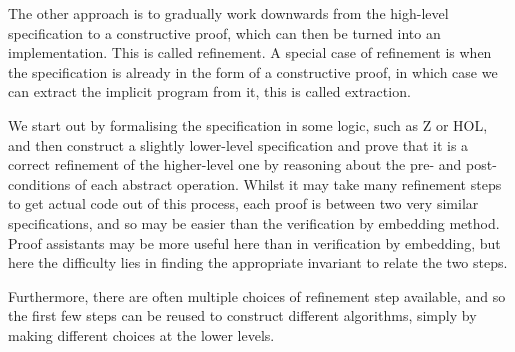 The other approach is to gradually work downwards from the high-level
specification to a constructive proof, which can then be turned into
an implementation. This is called refinement. A special case of
refinement is when the specification is already in the form of a
constructive proof, in which case we can extract the implicit program
from it, this is called extraction.

We start out by formalising the specification in some logic, such as Z
or HOL, and then construct a slightly lower-level specification and
prove that it is a correct refinement of the higher-level one by
reasoning about the pre- and post-conditions of each abstract
operation\cite{Woodcock96}. Whilst it may take many refinement steps
to get actual code out of this process, each proof is between two very
similar specifications, and so may be easier than the verification by
embedding method. Proof assistants may be more useful here than in
verification by embedding, but here the difficulty lies in finding the
appropriate invariant to relate the two steps\cite{Woodcock96}.

Furthermore, there are often multiple choices of refinement step
available, and so the first few steps can be reused to construct
different algorithms, simply by making different choices at the lower
levels\cite{Myreen10}.

